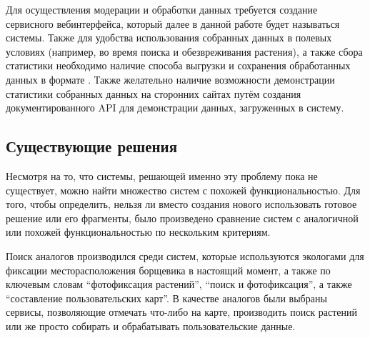 \nwln
Для осуществления модерации и обработки данных требуется создание сервисного вебинтерфейса, который далее в данной работе будет называться  системы.
Также для удобства использования собранных данных в полевых условиях (например, во время поиска и обезвреживания растения), а также сбора статистики необходимо наличие способа выгрузки и сохранения обработанных данных в формате .
Также желательно наличие возможности демонстрации статистики собранных данных на сторонних сайтах путём создания документированного API для демонстрации данных, загруженных в систему. \\

\subsection{Существующие решения}

\tab
Несмотря на то, что системы, решающей именно эту проблему пока не существует, можно найти множество систем с похожей функциональностью.
Для того, чтобы определить, нельзя ли вместо создания нового использовать готовое решение или его фрагменты, было произведено сравнение систем с аналогичной или похожей функциональностью по нескольким критериям.

\nwln
Поиск аналогов производился среди систем, которые используются экологами для фиксации месторасположения борщевика в настоящий момент, а также по ключевым словам “фотофиксация растений”, “поиск и фотофиксация”, а также “составление пользовательских карт”.
В качестве аналогов были выбраны сервисы, позволяющие отмечать что-либо на карте, производить поиск растений или же просто собирать и обрабатывать пользовательские данные.

